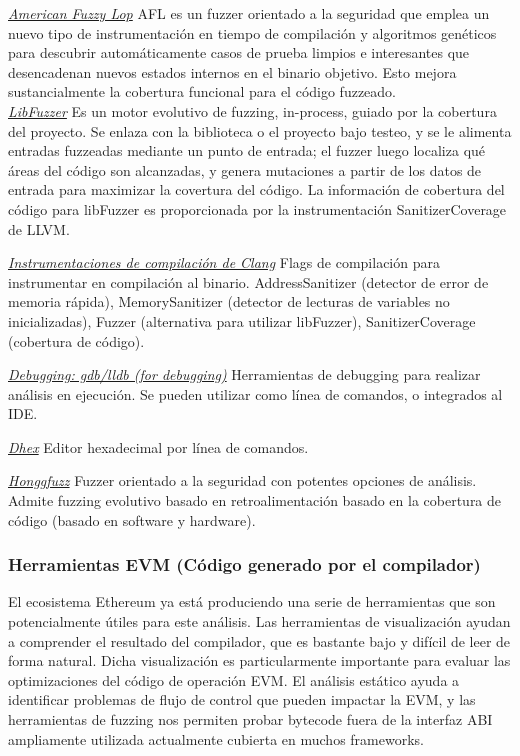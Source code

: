 \underline{\textit{American Fuzzy Lop}}
AFL es un fuzzer orientado a la seguridad que emplea un nuevo tipo de instrumentación en tiempo de compilación y algoritmos genéticos para descubrir automáticamente casos de prueba limpios e interesantes que desencadenan nuevos estados internos en el binario objetivo. Esto mejora sustancialmente la cobertura funcional para el código fuzzeado.\\

\underline{\textit{LibFuzzer}}
Es un motor evolutivo de fuzzing, in-process, guiado por la cobertura del proyecto.
Se enlaza con la biblioteca o el proyecto bajo testeo, y se le alimenta entradas fuzzeadas mediante un punto de entrada; el fuzzer luego localiza qué áreas del código son alcanzadas, y genera mutaciones a partir de los datos de entrada para maximizar la covertura del código.
La información de cobertura del código para libFuzzer es proporcionada por la instrumentación SanitizerCoverage de LLVM.

\underline{\textit{Instrumentaciones de compilación de Clang}}
Flags de compilación para instrumentar en compilación al binario.
AddressSanitizer (detector de error de memoria rápida), MemorySanitizer (detector de lecturas de variables no inicializadas), Fuzzer (alternativa para utilizar libFuzzer), SanitizerCoverage (cobertura de código).

\underline{\textit{Debugging: gdb/lldb (for debugging)}}
Herramientas de debugging para realizar análisis en ejecución. Se pueden utilizar como línea de comandos, o integrados al IDE.

\underline{\textit{Dhex}}
Editor hexadecimal por línea de comandos.

\underline{\textit{Honggfuzz}}
Fuzzer orientado a la seguridad con potentes opciones de análisis. Admite fuzzing evolutivo basado en retroalimentación basado en la cobertura de código (basado en software y hardware).

\subsubsection{Herramientas EVM (Código generado por el compilador)}

El ecosistema Ethereum ya está produciendo una serie de herramientas que son potencialmente útiles para este análisis. Las herramientas de visualización ayudan a comprender el resultado del compilador, que es bastante bajo y difícil de leer de forma natural. Dicha visualización es particularmente importante para evaluar las optimizaciones del código de operación EVM. El análisis estático ayuda a identificar problemas de flujo de control que pueden impactar la EVM, y las herramientas de fuzzing nos permiten probar bytecode fuera de la interfaz ABI ampliamente utilizada actualmente cubierta en muchos frameworks.\\

